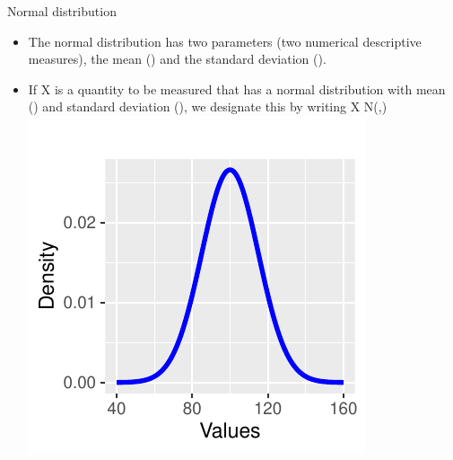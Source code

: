 \documentclass[
  ignorenonframetext,
]{beamer}
\providecommand{\tightlist}{%
  \setlength{\itemsep}{0pt}\setlength{\parskip}{0pt}}
\begin{document}
\begin{frame}{Normal distribution}
\label{normal-distribution}
\begin{itemize}
\tightlist
\item
  The normal distribution has two parameters (two numerical descriptive
  measures), the mean () and the standard deviation ().
\end{itemize}

\begin{itemize}
\tightlist
\item
  If X is a quantity to be measured that has a normal distribution with
  mean () and standard deviation (), we designate this by writing X N(,)
  \includegraphics{M5-Hypothesis-Testing,-Probability-and-Distribution_files/figure-beamer/unnamed-chunk-1-1.pdf}
\end{itemize}
\end{frame}
\end{document}
